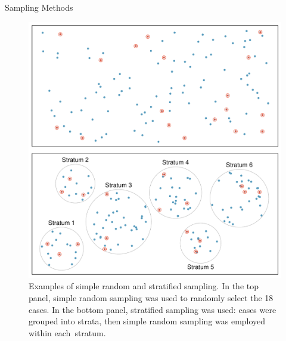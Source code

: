 \documentclass[notes,11pt, aspectratio=169]{beamer}
\begin{document}
\begin{frame}{Sampling Methods}
\begin{figure}
\centering
\includegraphics[scale = 0.3]{graphs/simple_stratified}
\caption{Examples of simple random and stratified sampling. In the top panel, simple random sampling was used to randomly select the 18 cases. In the bottom panel, stratified sampling was used: cases were grouped into strata, then simple random sampling was employed within \mbox{each stratum}.}
\label{simple_stratified}
\end{figure}

\end{frame}
\end{document}
